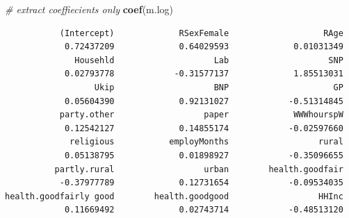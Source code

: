 \documentclass[]{article}
\newenvironment{Shaded}{\begin{snugshade}}{\end{snugshade}}
\newcommand{\CommentTok}[1]{\textcolor[rgb]{0.56,0.35,0.01}{\textit{#1}}}
\newcommand{\KeywordTok}[1]{\textcolor[rgb]{0.13,0.29,0.53}{\textbf{#1}}}
\newcommand{\NormalTok}[1]{#1}
\newcommand{\OperatorTok}[1]{\textcolor[rgb]{0.81,0.36,0.00}{\textbf{#1}}}
\begin{document}
\begin{Shaded}
\begin{Highlighting}[]
\CommentTok{# extract coeffiecients only}
\KeywordTok{coef}\NormalTok{(m.log)}
\end{Highlighting}
\end{Shaded}

\begin{verbatim}
           (Intercept)             RSexFemale                   RAge 
            0.72437209             0.64029593             0.01031349 
              Househld                    Lab                    SNP 
            0.02793778            -0.31577137             1.85513031 
                  Ukip                    BNP                     GP 
            0.05604390             0.92131027            -0.51314845 
           party.other                  paper             WWWhourspW 
            0.12542127             0.14855174            -0.02597660 
             religious           employMonths                  rural 
            0.05138795             0.01898927            -0.35096655 
          partly.rural                  urban        health.goodfair 
           -0.37977789             0.12731654            -0.09534035 
health.goodfairly good        health.goodgood                  HHInc 
            0.11669492             0.02743714            -0.48513120 
\end{verbatim}

\begin{Shaded}
\end{Shaded}
\end{document}
